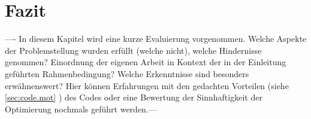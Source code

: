 \documentclass[../Report.tex]{subfiles}
\begin{document}
\chapter{Fazit}
\label{chap:fazit}
---- In diesem Kapitel wird eine kurze Evaluierung vorgenommen. Welche Aspekte der Problemstellung wurden erfüllt (welche nicht), welche Hindernisse genommen? Einordnung der eigenen Arbeit in Kontext der in der Einleitung geführten Rahmenbedingung? Welche Erkenntnisse sind besonders erwähnenswert? Hier können Erfahrungen mit den gedachten Vorteilen (siehe \ref{sec:code.mot} ) des Codes oder eine Bewertung der Sinnhaftigkeit der Optimierung nochmals geführt werden.--- 
\end{document}

